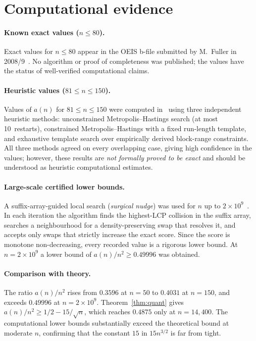 ﻿\documentclass[11pt,a4paper]{article}
\theoremstyle{plain}
\theoremstyle{definition}
\theoremstyle{remark}
\begin{document}
\section{Computational evidence}\label{sec:comp}

\paragraph{Known exact values ($n\le80$).}
Exact values for $n\le80$ appear in the OEIS b-file submitted by
M.\ Fuller in 2008/9~\cite{oeis}.  No algorithm or proof of completeness
was published; the values have the status of well-verified computational
claims.

\paragraph{Heuristic values ($81\le n\le150$).}
Values of $a(n)$ for $81\le n\le150$ were computed in~\cite{github}
using three independent heuristic methods: unconstrained
Metropolis--Hastings search (at most 10~restarts), constrained
Metropolis--Hastings with a fixed run-length template, and exhaustive
template search over empirically derived block-range constraints.
All three methods agreed on every overlapping case, giving high
confidence in the values; however, these results are \emph{not formally
proved to be exact} and should be understood as heuristic computational
estimates.

\paragraph{Large-scale certified lower bounds.}
A suffix-array-guided local search (\emph{surgical nudge}) was used for
$n$ up to $2\times10^9$~\cite{github}.  In each iteration the algorithm
finds the highest-LCP collision in the suffix array, searches a
neighbourhood for a density-preserving swap that resolves it, and
accepts only swaps that strictly increase the exact score.  Since the
score is monotone non-decreasing, every recorded value is a rigorous
lower bound.  At $n=2\times10^9$ a lower bound of $a(n)/n^2\ge0.49996$
was obtained.

\paragraph{Comparison with theory.}
The ratio $a(n)/n^2$ rises from $0.3596$ at $n=50$ to $0.4031$ at
$n=150$, and exceeds $0.49996$ at $n=2\times10^9$.  
Theorem~\ref{thm:quant} gives $a(n)/n^2\ge1/2-15/\sqrt{n}$, which
reaches $0.4875$ only at $n=14{,}400$.  The computational lower bounds
substantially exceed the theoretical bound at moderate $n$, confirming
that the constant $15$ in $15n^{3/2}$ is far from tight.
\end{document}
